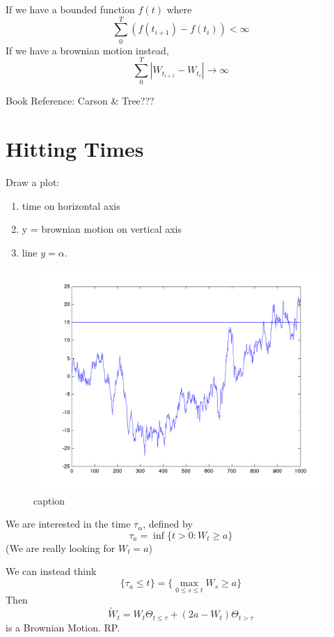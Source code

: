 If we have a bounded function $f(t)$ where
\begin{equation}
	\sum_{0}^T \left( f(t_{i+1}) - f(t_i) \right) < \infty
\end{equation}
If we have a brownian motion instead,
\begin{equation}
	\sum_0^T \left| W_{t_{i+1}} - W_{t_i} \right| \to \infty
\end{equation}

Book Reference: Carson \& Tree???

\section{Hitting Times}
Draw a plot:
\begin{enumerate}
	\item time on horizontal axis
	\item y = brownian motion on vertical axis
	\item line $y=\alpha$.
\end{enumerate}

\begin{figure}[htbp]
	\centering
		\includegraphics[width=.9\linewidth]{brownian_motion.png}
	\caption{caption}
	\label{fig:label}
\end{figure}

We are interested in the time $\tau_{\alpha}$, defined by
\begin{equation}
	\tau_a = \inf \{ t>0 : W_t \geq a \}
\end{equation}
(We are really looking for $W_t=a$)

We can instead think
\begin{equation}
	\{ \tau_a\leq t \} = \{ \max_{0\leq s \leq t} W_s \geq a \}
\end{equation}
Then
\begin{equation}
	\tilde{W}_t = W_t \Theta_{t \leq \tau} + (2a - W_t) \Theta_{t > \tau}
\end{equation}
is a Brownian Motion. RP.

